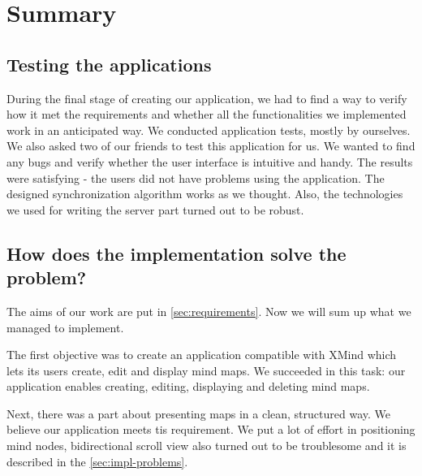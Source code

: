 %
%
%
%
%

\chapter{Summary}
\label{chap:summary}

\section{Testing the applications}
\label{sec:summary-testing}
During the final stage of creating our application, we had to find a way to verify how it met the requirements and whether all the functionalities we implemented work in an anticipated way. We conducted application tests, mostly by ourselves. We also asked two of our friends to test this application for us. We wanted to find any bugs and verify whether the user interface is intuitive and handy. The results were satisfying - the users did not have problems using the application. The designed synchronization algorithm works as we thought. Also, the technologies we used for writing the server part turned out to be robust.

\section{How does the implementation solve the problem?}
\label{sec:summary-how-solve}
The aims of our work are put in \cref{sec:requirements}. Now we will sum up what we managed to implement. 
 
The first objective was to create an application compatible with XMind which lets its users create, edit and display mind maps. We succeeded in this task: our application enables creating, editing, displaying and deleting mind maps.

Next, there was a part about presenting maps in a clean, structured way. We believe our application meets tis requirement. We put a lot of effort in positioning mind nodes, bidirectional scroll view also turned out to be troublesome and it is described in the \cref{sec:impl-problems}.

